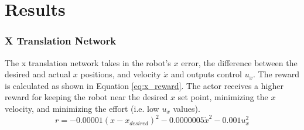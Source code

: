 \section{Results}
\subsubsection{X Translation Network}
The x translation network takes in the robot's $x$ error, the difference between the desired and actual $x$ positions, and velocity $\dot{x}$ and outputs control $u_x$. The reward is calculated as shown in Equation \ref{eq:x_reward}. The actor receives a higher reward for keeping the robot near the desired $x$ set point, minimizing the $x$ velocity, and minimizing the effort (i.e. low $u_x$ values).
\begin{equation}
r = -0.00001(x-x_{desired})^2-0.0000005\dot{x}^2-0.001u_x^2
\label{eq:x_reward}
\end{equation}

